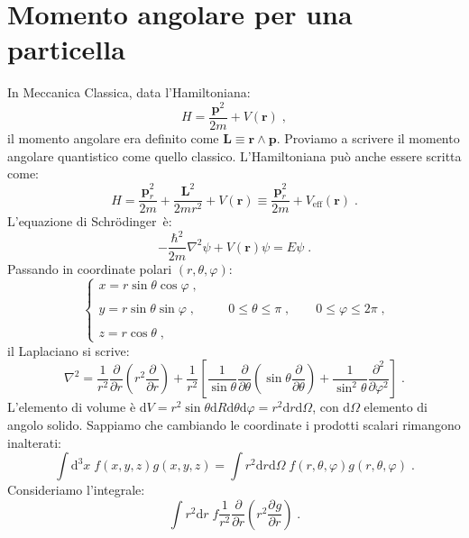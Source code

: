 \documentclass[10pt,a4paper]{report}
\theoremstyle{definition}
\newcommand{\pdev}[3][]{\frac{\partial^{#1} #2}{\partial #3^{#1}}}
\numberwithin{equation}{section}
\newcommand{\diff}[1][]{\mathrm{d}#1}
\newcommand{\Sch}{Schrödinger}
\begin{document}
\section{Momento angolare per una particella}
In Meccanica Classica, data l'Hamiltoniana:
\begin{equation}
H=\frac{\mathbf{p}^2}{2m}+V(\mathbf{r})\;,
\end{equation}
il momento angolare era definito come $\mathbf{L}\equiv\mathbf{r}\wedge \mathbf{p}$. Proviamo a scrivere il momento angolare quantistico come quello classico. L'Hamiltoniana può anche essere scritta come:
\begin{equation}
H=\frac{\mathbf{p}_r^2}{2m}+\frac{\mathbf{L}^2}{2mr^2}+V(\mathbf{r})\equiv \frac{\mathbf{p}_r^2}{2m}+V_{\mathrm{eff}}(\mathbf{r})\;.
\end{equation}
L'equazione di \Sch\, è:
\begin{equation}
-\frac{\hbar^2}{2m}\nabla^2\psi+V(\mathbf{r})\psi=E\psi\;.
\end{equation}
Passando in coordinate polari $(r,\theta,\varphi)$:
\begin{equation}
\begin{cases}
x=r\sin\theta\cos\varphi\;, \\
\\
y=r\sin\theta\sin\varphi\;, \\
\\
z=r\cos\theta\;,
\end{cases} \qquad 0\le\theta\le\pi\;, \qquad 0\le\varphi\le 2\pi\;,
\end{equation}
il Laplaciano si scrive:
\begin{equation}
\nabla^2=\frac{1}{r^2}\frac{\partial}{\partial r}\left(r^2\frac{\partial}{\partial r}\right)+\frac{1}{r^2}\left[\frac{1}{\sin\theta}\frac{\partial}{\partial\theta}\left(\sin\theta\frac{\partial}{\partial\theta}\right)+\frac{1}{\sin^2\theta}\frac{\partial^2}{\partial\varphi^2}\right]\;.
\end{equation}
L'elemento di volume è $\diff{V}=r^2\sin\theta\diff{R}\diff{\theta}\diff{\varphi}=r^2\diff{r}\diff{\Omega}$, con $\diff{\Omega}$ elemento di angolo solido. Sappiamo che cambiando le coordinate i prodotti scalari rimangono inalterati:
\begin{equation}
\int\diff^3{x}\;f(x,y,z)g(x,y,z)=\int r^2\diff{r}\diff{\Omega}\; f(r,\theta,\varphi)g(r,\theta,\varphi)\;.
\end{equation}
Consideriamo l'integrale:
\begin{equation}
\int r^2\diff{r}\; f\frac{1}{r^2}\frac{\partial}{\partial r}\left(r^2\pdev{g}{r}\right)\;.
\end{equation}
\end{document}

